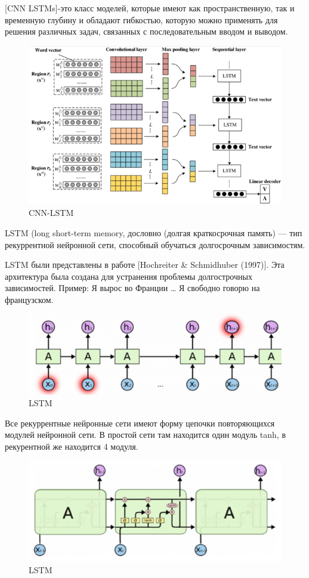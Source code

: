 \documentclass{article}
\begin{document}
[CNN LSTMs]-это класс моделей, которые имеют как пространственную, так и временную глубину и обладают гибкостью, которую можно применять для решения различных задач, связанных с последовательным вводом и выводом.


\begin{figure}[!tbh]
    \centering
    \includegraphics[width=0.9\linewidth]{CNN-LSTM.png}
    \caption{CNN-LSTM}
    \label{fig:circle}
\end{figure}

LSTM (long short-term memory, дословно (долгая краткосрочная память) — тип рекуррентной нейронной сети, способный обучаться долгосрочным зависимостям. 

LSTM были представлены в работе [Hochreiter & Schmidhuber (1997)]. Эта архитектура была создана для устранения проблемы долгострочных зависимостей. Пример: Я вырос во Франции … Я свободно говорю на французском.

\begin{figure}[!tbh]
    \centering
    \includegraphics[width=0.9\linewidth]{2.png}
    \caption{LSTM}
    \label{fig:circle}
\end{figure}

Все рекуррентные нейронные сети имеют форму цепочки повторяющихся модулей нейронной сети. В простой сети там находится один модуль tanh, в рекурентной же находится 4 модуля.

\begin{figure}[!tbh]
    \centering
    \includegraphics[width=0.9\linewidth]{3.png}
    \caption{LSTM}
    \label{fig:circle}
\end{figure}
\end{document}

